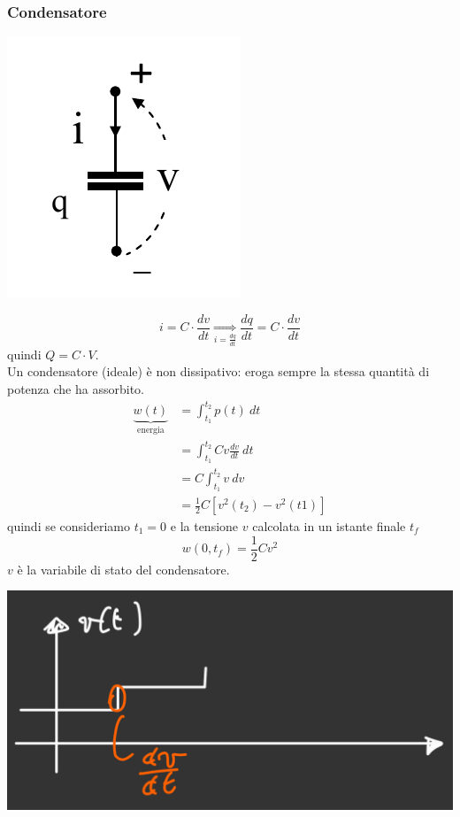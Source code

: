 \documentclass{article}
\begin{document}
\subsubsection{Condensatore}
\begin{center}
    \includegraphics[scale=0.4]{Image/Condensatore.png}
\end{center}
\[
    i = C \cdot \dfrac{dv}{dt} \underset{i=\frac{dq}{dt}}{\Longrightarrow} \frac{dq}{dt} = C \cdot \frac{dv}{dt}
\]
quindi $Q = C \cdot V$.\\
Un condensatore (ideale) è non dissipativo: eroga sempre la stessa quantità di potenza che ha assorbito.
\begin{align*}
    \underbrace{w(t)}_{\text{energia}} &= \int_{t_1}^{t_2} p(t) \ dt\\
    &= \int_{t_1}^{t_2} C v  \frac{dv}{dt} \ dt\\
    &= C \int_{t_1}^{t_2} v \ dv\\
    &= \frac{1}{2} C \left[v^2(t_2) - v^2(t1)\right]
\end{align*}
quindi se consideriamo $t_1=0$ e la tensione $v$ calcolata in un istante finale $t_f$
\[
    w(0,t_f) = \frac{1}{2}Cv^2
\]
$v$ è la variabile di stato del condensatore.
\begin{center}
    \includegraphics[scale=0.22]{Image/Grafico condensatore.png}
\end{center}
\end{document}
